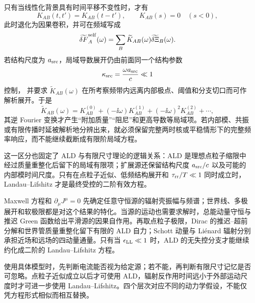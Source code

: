 只有当线性化背景具有时间平移不变性时，才有
\begin{equation}
 K_{AB}(t,t')=K_{AB}(t-t'),
 \qquad K_{AB}(s)=0\quad(s<0),
 \label{eq:phys-rr-stationary-memory-kernel}
\end{equation}
此时退化为因果卷积，并可在频域写成
\[
 \widetilde{\delta F}_A^{\rm self}(\omega)
 =\sum_B\widetilde K_{AB}(\omega)\widetilde{\delta\Xi}_B(\omega).
\]
若结构尺度为 \(a_{\rm src}\)，局域导数展开仍由前面同一个结构参数
\[
 \kappa_{\rm src}=\frac{\omega a_{\rm src}}{c}\ll1
\]
控制，
并要求 \(\widetilde K_{AB}(\omega)\) 在所考察频带内远离内部极点、阈值和分支切口而可作解析展开。于是
\[
\widetilde K_{AB}(\omega)
=K^{(0)}_{AB}
+(-\ii\omega)K^{(1)}_{AB}
+(-\ii\omega)^2K^{(2)}_{AB}+\cdots,
\]
其逆 Fourier 变换才产生“附加质量”“阻尼”和更高导数等局域项。若内部模、共振或有限传播时延被解析地分辨出来，就必须保留完整两时核或平稳情形下的完整频率响应，而不能继续截断成有限阶局域方程。

这一区分也固定了 ALD 与有限尺寸理论的逻辑关系：ALD 是理想点粒子缩限中经过质量重整化后留下的局域有限项；扩展源还保留结构尺度 \(a_{\rm src}/c\) 以及可能的内部模时间尺度。只有在点粒子近似、低频结构展开和 \(\tau_{\rm rr}/T\ll1\) 同时成立时，Landau--Lifshitz 才是最终受控的二阶有效方程。

Maxwell 方程和 \(\partial_\mu J^\mu=0\) 先确定任意守恒源的辐射壳振幅与频谱；世界线、多极展开和软极限都是对这个结果的特化。当源的运动也需要求解时，总能动量守恒与推迟 Green 函数给出平滑源的因果自作用。再取点粒子极限，Dirac 的推迟--超前分解和世界管质量重整化留下有限的 ALD 自力；Schott 动量与 Liénard 辐射分别承担近场和远场的四动量通量。只有当 \(\epsilon_{\rm LL}\ll1\) 时，ALD 的无失控分支才能继续约化成二阶的 Landau--Lifshitz 方程。

使用具体模型时，先判断电流能否视为给定源；若不能，再判断有限尺寸记忆是否可忽略。点粒子近似成立以后才可使用 ALD，辐射反作用时间远小于外部运动尺度时才可进一步使用 Landau--Lifshitz。四个层次对应不同的动力学假设，不能仅凭方程形式相似而相互替换。


